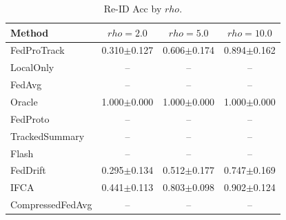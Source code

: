 \begin{table}[t]
\centering
\caption{Re-ID Acc by $rho$.}
\label{tab:rho_concept_re_id_accuracy}
\begin{tabular}{lccc}
\toprule
Method & $rho=2.0$ & $rho=5.0$ & $rho=10.0$ \\
\midrule
FedProTrack & 0.310$\pm$0.127 & 0.606$\pm$0.174 & 0.894$\pm$0.162 \\
LocalOnly & -- & -- & -- \\
FedAvg & -- & -- & -- \\
Oracle & 1.000$\pm$0.000 & 1.000$\pm$0.000 & 1.000$\pm$0.000 \\
FedProto & -- & -- & -- \\
TrackedSummary & -- & -- & -- \\
Flash & -- & -- & -- \\
FedDrift & 0.295$\pm$0.134 & 0.512$\pm$0.177 & 0.747$\pm$0.169 \\
IFCA & 0.441$\pm$0.113 & 0.803$\pm$0.098 & 0.902$\pm$0.124 \\
CompressedFedAvg & -- & -- & -- \\
\bottomrule
\end{tabular}
\end{table}